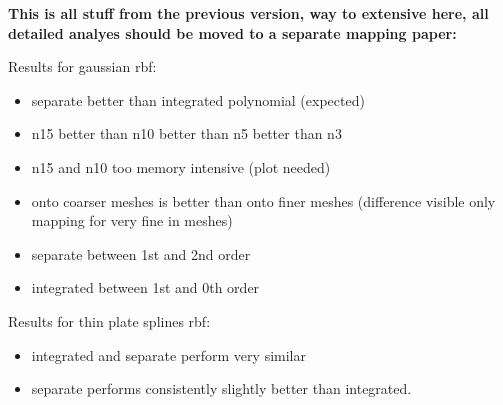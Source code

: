 \textbf{This is all stuff from the previous version, way to extensive here, all detailed analyes should be moved to a separate mapping paper:}

Results for gaussian rbf:
\begin{itemize}
  \item separate better than integrated polynomial (expected)
  \item n15 better than n10 better than n5 better than n3
  \item n15 and n10 too memory intensive (plot needed)
  \item onto coarser meshes is better than onto finer meshes (difference visible only mapping for very fine in meshes)
  \item separate between 1st and 2nd order
  \item integrated between 1st and 0th order
\end{itemize}

Results for thin plate splines rbf:
\begin{itemize}
  \item integrated and separate perform very similar 
  \item separate performs consistently slightly better than integrated.
\end{itemize}

